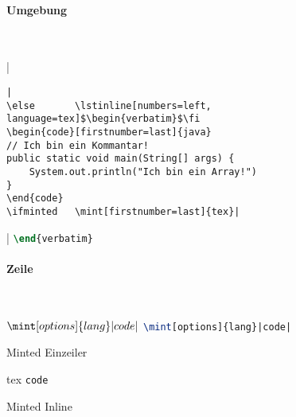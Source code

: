 \paragraph{Umgebung}~\\
\begin{listing}
\ifminted   {}|\begin{verbatim}|
\else       \lstinline[numbers=left, language=tex]$\begin{verbatim}$\fi
\begin{code}[firstnumber=last]{java}
// Ich bin ein Kommantar!
public static void main(String[] args) {
    System.out.println("Ich bin ein Array!")
}
\end{code}
\ifminted   \mint[firstnumber=last]{tex}|\end{verbatim}|
\else       \lstinline[firstnumber=last, numbers=left, language=tex]$\end{verbatim}$\fi
\caption{Minted Umgebung}
\label{lst:minted-env}
\end{listing}

\paragraph{Zeile}~\\
\begin{listing}
\ifminted   {}$\mint[options]{lang}|code|$
\else       \lstinline[language=tex]$\mint[options]{lang}|code|$\fi
\caption{Minted Einzeiler}
\label{lst:minted-line}
\end{listing}

\begin{listing}
\begin{code}{tex}
\texttt{code}
\end{code}
\caption{Minted Inline}
\label{lst:minted-inline}
\end{listing}